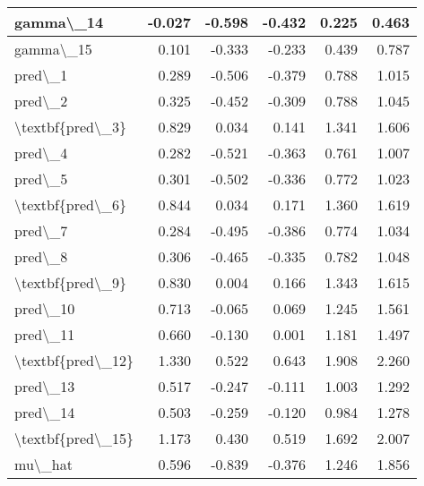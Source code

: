 \documentclass[
  11pt,
  letterpaper,
  DIV=11,
  numbers=noendperiod]{scrartcl}
\begin{document}
\begin{table}
\begin{tabular}[t]{l|r|r|r|r|r}
\hline
gamma\textbackslash{}\_14 & -0.027 & -0.598 & -0.432 & 0.225 & 0.463\\
\hline
gamma\textbackslash{}\_15 & 0.101 & -0.333 & -0.233 & 0.439 & 0.787\\
\hline
pred\textbackslash{}\_1 & 0.289 & -0.506 & -0.379 & 0.788 & 1.015\\
\hline
pred\textbackslash{}\_2 & 0.325 & -0.452 & -0.309 & 0.788 & 1.045\\
\hline
\textbackslash{}textbf\{pred\textbackslash{}\_3\} & 0.829 & 0.034 & 0.141 & 1.341 & 1.606\\
\hline
pred\textbackslash{}\_4 & 0.282 & -0.521 & -0.363 & 0.761 & 1.007\\
\hline
pred\textbackslash{}\_5 & 0.301 & -0.502 & -0.336 & 0.772 & 1.023\\
\hline
\textbackslash{}textbf\{pred\textbackslash{}\_6\} & 0.844 & 0.034 & 0.171 & 1.360 & 1.619\\
\hline
pred\textbackslash{}\_7 & 0.284 & -0.495 & -0.386 & 0.774 & 1.034\\
\hline
pred\textbackslash{}\_8 & 0.306 & -0.465 & -0.335 & 0.782 & 1.048\\
\hline
\textbackslash{}textbf\{pred\textbackslash{}\_9\} & 0.830 & 0.004 & 0.166 & 1.343 & 1.615\\
\hline
pred\textbackslash{}\_10 & 0.713 & -0.065 & 0.069 & 1.245 & 1.561\\
\hline
pred\textbackslash{}\_11 & 0.660 & -0.130 & 0.001 & 1.181 & 1.497\\
\hline
\textbackslash{}textbf\{pred\textbackslash{}\_12\} & 1.330 & 0.522 & 0.643 & 1.908 & 2.260\\
\hline
pred\textbackslash{}\_13 & 0.517 & -0.247 & -0.111 & 1.003 & 1.292\\
\hline
pred\textbackslash{}\_14 & 0.503 & -0.259 & -0.120 & 0.984 & 1.278\\
\hline
\textbackslash{}textbf\{pred\textbackslash{}\_15\} & 1.173 & 0.430 & 0.519 & 1.692 & 2.007\\
\hline
mu\textbackslash{}\_hat & 0.596 & -0.839 & -0.376 & 1.246 & 1.856\\
\hline
\end{tabular}
\end{table}
\end{document}
